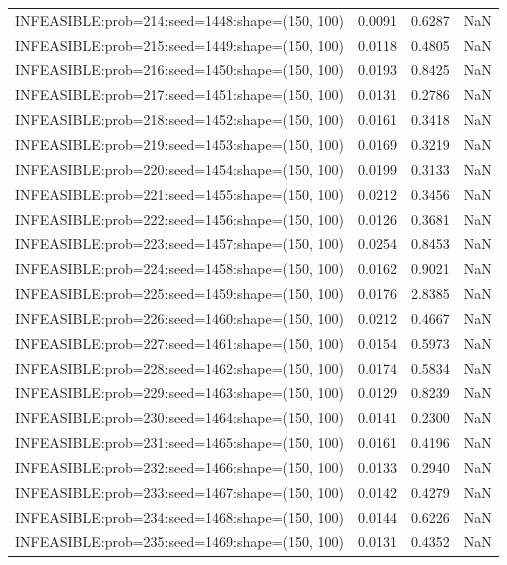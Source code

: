 \begin{longtable}{lccc}
INFEASIBLE:prob=214:seed=1448:shape=(150, 100) &   0.0091 &  0.6287 &    NaN \\
INFEASIBLE:prob=215:seed=1449:shape=(150, 100) &   0.0118 &  0.4805 &    NaN \\
INFEASIBLE:prob=216:seed=1450:shape=(150, 100) &   0.0193 &  0.8425 &    NaN \\
INFEASIBLE:prob=217:seed=1451:shape=(150, 100) &   0.0131 &  0.2786 &    NaN \\
INFEASIBLE:prob=218:seed=1452:shape=(150, 100) &   0.0161 &  0.3418 &    NaN \\
INFEASIBLE:prob=219:seed=1453:shape=(150, 100) &   0.0169 &  0.3219 &    NaN \\
INFEASIBLE:prob=220:seed=1454:shape=(150, 100) &   0.0199 &  0.3133 &    NaN \\
INFEASIBLE:prob=221:seed=1455:shape=(150, 100) &   0.0212 &  0.3456 &    NaN \\
INFEASIBLE:prob=222:seed=1456:shape=(150, 100) &   0.0126 &  0.3681 &    NaN \\
INFEASIBLE:prob=223:seed=1457:shape=(150, 100) &   0.0254 &  0.8453 &    NaN \\
INFEASIBLE:prob=224:seed=1458:shape=(150, 100) &   0.0162 &  0.9021 &    NaN \\
INFEASIBLE:prob=225:seed=1459:shape=(150, 100) &   0.0176 &  2.8385 &    NaN \\
INFEASIBLE:prob=226:seed=1460:shape=(150, 100) &   0.0212 &  0.4667 &    NaN \\
INFEASIBLE:prob=227:seed=1461:shape=(150, 100) &   0.0154 &  0.5973 &    NaN \\
INFEASIBLE:prob=228:seed=1462:shape=(150, 100) &   0.0174 &  0.5834 &    NaN \\
INFEASIBLE:prob=229:seed=1463:shape=(150, 100) &   0.0129 &  0.8239 &    NaN \\
INFEASIBLE:prob=230:seed=1464:shape=(150, 100) &   0.0141 &  0.2300 &    NaN \\
INFEASIBLE:prob=231:seed=1465:shape=(150, 100) &   0.0161 &  0.4196 &    NaN \\
INFEASIBLE:prob=232:seed=1466:shape=(150, 100) &   0.0133 &  0.2940 &    NaN \\
INFEASIBLE:prob=233:seed=1467:shape=(150, 100) &   0.0142 &  0.4279 &    NaN \\
INFEASIBLE:prob=234:seed=1468:shape=(150, 100) &   0.0144 &  0.6226 &    NaN \\
INFEASIBLE:prob=235:seed=1469:shape=(150, 100) &   0.0131 &  0.4352 &    NaN \\

\end{longtable}
